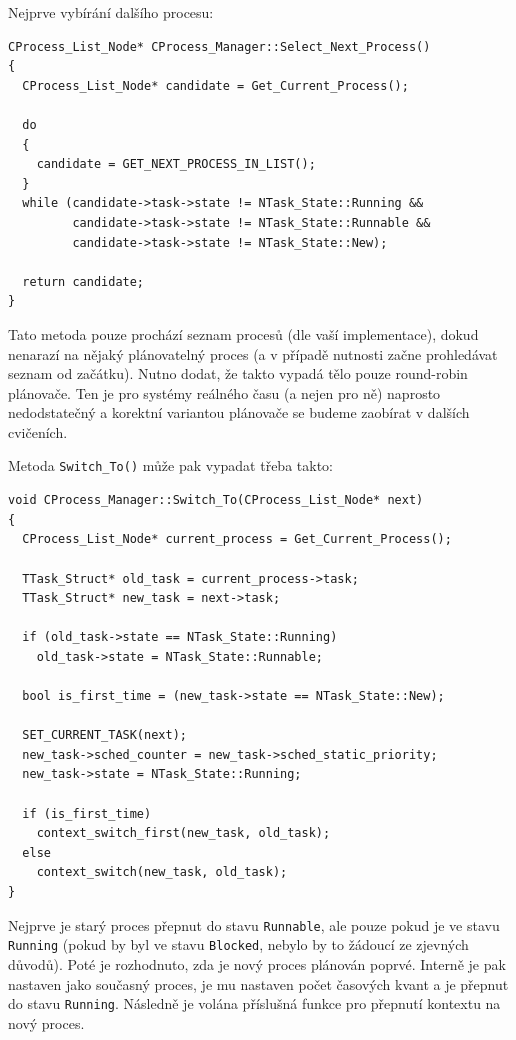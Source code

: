 \documentclass{article}
\begin{document}
Nejprve vybírání dalšího procesu:
\begin{lstlisting}
CProcess_List_Node* CProcess_Manager::Select_Next_Process()
{
  CProcess_List_Node* candidate = Get_Current_Process();
	
  do
  {
    candidate = GET_NEXT_PROCESS_IN_LIST();
  }
  while (candidate->task->state != NTask_State::Running &&
         candidate->task->state != NTask_State::Runnable &&
         candidate->task->state != NTask_State::New);
         
  return candidate;
}
\end{lstlisting}

Tato metoda pouze prochází seznam procesů (dle vaší implementace), dokud nenarazí na nějaký plánovatelný proces (a v případě nutnosti začne prohledávat seznam od začátku). Nutno dodat, že takto vypadá tělo pouze  round-robin plánovače. Ten je pro systémy reálného času (a nejen pro ně) naprosto nedodstatečný a korektní variantou plánovače se budeme zaobírat v dalších cvičeních.

Metoda \texttt{Switch\_To()} může pak vypadat třeba takto:
\begin{lstlisting}
void CProcess_Manager::Switch_To(CProcess_List_Node* next)
{
  CProcess_List_Node* current_process = Get_Current_Process();
  
  TTask_Struct* old_task = current_process->task;
  TTask_Struct* new_task = next->task;
  
  if (old_task->state == NTask_State::Running)
    old_task->state = NTask_State::Runnable;
    
  bool is_first_time = (new_task->state == NTask_State::New);
  
  SET_CURRENT_TASK(next);
  new_task->sched_counter = new_task->sched_static_priority; 
  new_task->state = NTask_State::Running;
  
  if (is_first_time)
    context_switch_first(new_task, old_task);
  else
    context_switch(new_task, old_task);
}
\end{lstlisting}

Nejprve je starý proces přepnut do stavu \texttt{Runnable}, ale pouze pokud je ve stavu \texttt{Running} (pokud by byl ve stavu \texttt{Blocked}, nebylo by to žádoucí ze zjevných důvodů). Poté je rozhodnuto, zda je nový proces plánován poprvé. Interně je pak nastaven jako současný proces, je mu nastaven počet časových kvant a je přepnut do stavu \texttt{Running}. Následně je volána příslušná funkce pro přepnutí kontextu na nový proces.
\end{document}
